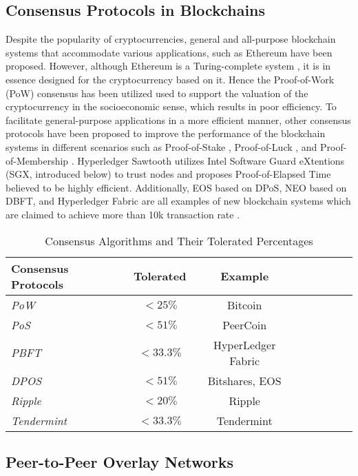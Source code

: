 \subsection{Consensus Protocols in Blockchains}

Despite the popularity of cryptocurrencies, general and all-purpose blockchain systems that accommodate various applications, such as Ethereum \cite{wood2014ethereum} have been proposed. However, although Ethereum is a Turing-complete system \cite{wood2014ethereum}, it is in essence designed for the cryptocurrency based on it. Hence the Proof-of-Work (PoW) consensus has been utilized used to support the valuation of the cryptocurrency in the socioeconomic sense, which results in poor efficiency. To facilitate general-purpose applications in a more efficient manner, other consensus protocols have been proposed to improve the performance of the blockchain systems in different scenarios such as Proof-of-Stake \cite{kiayias2017ouroboros}, Proof-of-Luck \cite{milutinovic2016proof}, and Proof-of-Membership \cite{kogias2016enhancing}. Hyperledger Sawtooth \cite{sawtooth} utilizes Intel Software Guard eXtentions (SGX, introduced below) to trust nodes and proposes Proof-of-Elapsed Time believed to be highly efficient. Additionally, EOS \cite{eosio} based on DPoS, NEO \cite{hoxha2018hashgraph} based on DBFT, and Hyperledger Fabric \cite{cachin2016architecture} are all examples of new blockchain systems which are claimed to achieve more than 10k transaction rate \cite{bach2018comparative}.

\begin{table}
	\begin{tabular}{l*{6}{c}r}
		Consensus Protocols & Tolerated & Example \\
		\hline		
		\textit{PoW} & $<25\%$ & Bitcoin \\
		\textit{PoS} & $<51\%$ & PeerCoin \\
		\textit{PBFT} & $<33.3\%$ & HyperLedger Fabric \\
		\textit{DPOS} & $<51\%$ & Bitshares, EOS\\
		\textit{Ripple} & $<20\%$ & Ripple \\
		\textit{Tendermint} & $<33.3\%$ & Tendermint \\
	\end{tabular}
	\caption{Consensus Algorithms and Their Tolerated Percentages}
	\label{tab:packet1}
\end{table}

\subsection{Peer-to-Peer Overlay Networks}

